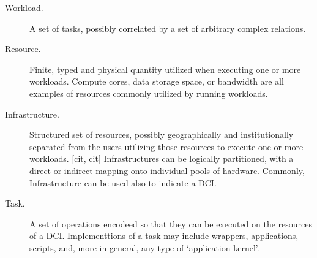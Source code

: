 \documentclass{sig-alternate}
\begin{document}
\begin{description}


\item[Workload.] A set of tasks, possibly correlated by a set of
arbitrary complex relations.

\item[Resource.] Finite, typed and physical quantity utilized when
executing one or more workloads. Compute cores, data storage space, or
bandwidth are all examples of resources commonly utilized by running
workloads.

\item[Infrastructure.] Structured set of resources, possibly
geographically and institutionally separated from the users   utilizing
those resources to execute one or more workloads. [cit, cit]
Infrastructures can be logically partitioned, with a direct or indirect
mapping onto individual pools of hardware. Commonly, Infrastructure can
be used also to indicate a DCI.


\item[Task.] A set of operations encodeed so that they can be executed
on the resources of a DCI. Implementtions of a task may include
wrappers, applications, scripts, and, more in general, any type of
`application kernel'.


\end{description}
\end{document}
